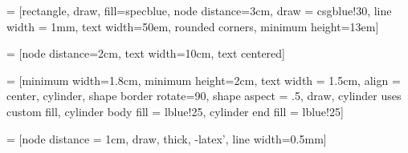 \documentclass{article}
\begin{document}
	
\pagestyle{empty}


 = [rectangle, draw, fill=specblue, node distance=3cm, draw = csgblue!30, line width = 1mm,
text width=50em, rounded corners, minimum height=13em]

 = [node distance=2cm, text width=10cm, text centered]

 = [minimum width=1.8cm, minimum height=2cm, text width = 1.5cm, align = center,
cylinder, shape border rotate=90, shape aspect = .5, draw, 
cylinder uses custom fill, cylinder body fill = lblue!25, cylinder end fill = lblue!25]

  = [node distance = 1cm, draw, thick, -latex', line width=0.5mm]

\end{document}
